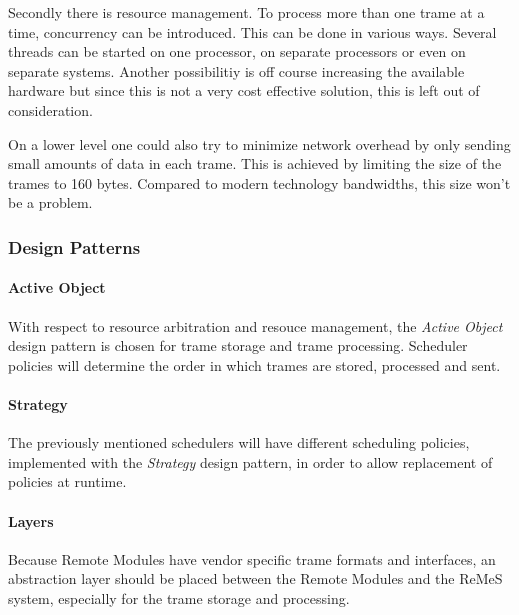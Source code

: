 \npar Secondly there is resource management. To process more than one trame at a
time, concurrency can be introduced. This can be done in various ways. Several
threads can be started on one processor, on separate processors or even on
separate systems. Another possibilitiy is off course increasing the available
hardware but since this is not a very cost effective solution, this is left out
of consideration.

\npar On a lower level one could also try to minimize network overhead by
only sending small amounts of data in each trame. This is achieved by
limiting the size of the trames to 160 bytes. Compared to modern technology
bandwidths, this size won't be a problem. 

\subsubsection{Design Patterns}
\label{add:it1/patterns}

\paragraph{Active Object}

\npar With respect to resource arbitration and resouce management, the
\emph{Active Object} design pattern \citep[see][p.~365q]{Buschmann:07} is chosen
for trame storage and trame processing. Scheduler policies will determine the
order in which trames are stored, processed and sent.

\paragraph{Strategy}

\npar The previously mentioned schedulers will have different scheduling
policies, implemented with the \emph{Strategy} design pattern, in order to
allow replacement of policies at runtime.

\paragraph{Layers}

\npar Because Remote Modules have vendor specific trame formats and interfaces,
an abstraction layer should be placed between the Remote Modules and the ReMeS
system, especially for the trame storage and processing.

